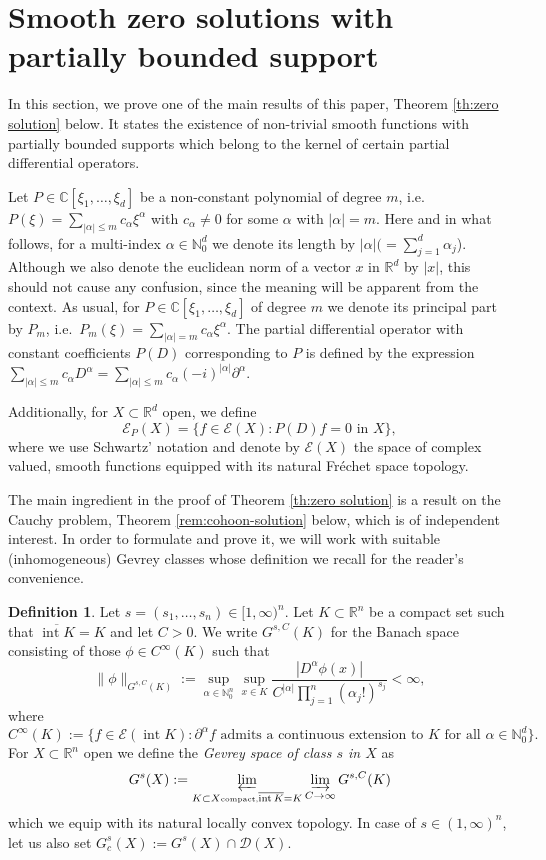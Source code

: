 \documentclass[a4paper,10pt]{amsart}
\newtheorem*{crucial lemma}{Lemma \ref{lem:nice polynomial2}}
\theoremstyle{definition}
\newtheorem{definition}[theorem]{Definition}
\newcommand{\R}{\mathbb{R}}
\newcommand{\C}{\mathbb{C}}
\newcommand{\N}{\mathbb{N}}
\begin{document}
\section{Smooth zero solutions with partially bounded support}\label{section:zero solutions}

In this section, we prove one of the main results of this paper, Theorem \ref{th:zero solution} below. It states the existence of non-trivial smooth functions with partially bounded supports which belong to the kernel of certain partial differential operators.

Let $P\in\C[\xi_1,\ldots,\xi_d]$ be a non-constant polynomial of degree $m$, i.e.~$P(\xi)=\sum_{|\alpha|\leq m} c_\alpha \xi^\alpha$ with $c_\alpha\neq 0$ for some $\alpha$ with $|\alpha|=m$. Here and in what follows, for a multi-index $\alpha\in\N_0^d$ we denote its length by $|\alpha|(=\sum_{j=1}^d\alpha_j$). Although we also denote the euclidean norm of a vector $x$ in $\R^d$ by $|x|$, this should not cause any confusion, since the meaning will be apparent from the context. As usual, for $P\in\C[\xi_1,\ldots,\xi_d]$ of degree $m$ we denote its principal part by $P_m$, i.e.~$P_m(\xi)=\sum_{|\alpha|= m} c_\alpha \xi^\alpha$. The partial differential operator with constant coefficients $P(D)$ corresponding to $P$ is defined by the expression $\sum_{|\alpha|\leq m}c_\alpha D^\alpha=\sum_{|\alpha|\leq m}c_\alpha (-i)^{|\alpha|}\partial^\alpha$.

Additionally, for $X\subset\R^d$ open, we define
\[\mathscr{E}_P(X)=\{f\in\mathscr{E}(X) \colon P(D)f=0\text{ in }X\},\]
where we use Schwartz' notation \cite{Schwartz1966} and denote by $\mathscr{E}(X)$ the space of complex valued, smooth functions equipped with its natural Fr\'echet space topology.

The main ingredient in the proof of Theorem \ref{th:zero solution} is a result on the Cauchy problem, Theorem \ref{rem:cohoon-solution} below, which is of independent interest. In order to formulate and prove it, we will work with suitable (inhomogeneous) Gevrey classes whose definition we recall for the reader's convenience. 

\begin{definition}\label{def:Gevrey}
	Let $s=(s_1,\ldots,s_n)\in [1,\infty)^n$. Let $K\subset\R^n$ be a compact set such that $\overline{\operatorname{int}K}=K$ and let $C>0$. We write $G^{s,C}(K)$ for the Banach space consisting of those $\phi\in C^\infty(K)$ such that
	\[\|\phi\|_{G^{s,C}(K)}:=\sup_{\alpha\in\N_0^n}\sup_{x\in K}\frac{|D^\alpha\phi(x)|}{C^{|\alpha|} \prod_{j=1}^n (\alpha_j!)^{s_j}}<\infty,\]
where 
$$C^\infty(K):=\{f\in \mathscr{E}(\operatorname{int}K)\colon \partial^\alpha f\text{ admits a continuous extension to }K\text{ for all }\alpha\in\N_0^d\}.$$
	For $X\subset\R^n$ open we define the \emph{Gevrey space of class $s$ in $X$} as
	\[G^s(X):=\varprojlim_{K \subset X\mbox{\tiny compact,} \overline{\operatorname{int}K}=K} \varinjlim_{C\rightarrow \infty}G^{s,C}(K)\]
	which we equip with its natural locally convex topology. In case of $s\in(1,\infty)^n$, let us also set $G^s_c(X):=G^s(X)\cap\mathscr{D}(X)$.
\end{definition}
\end{document}
